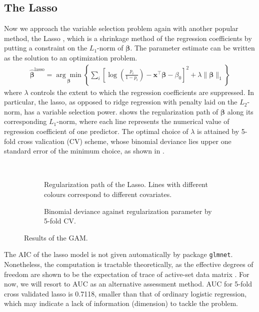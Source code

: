 \subsection{The Lasso}
Now we approach the variable selection problem again with another popular method, the Lasso \cite{Friedman:2001:ESL}, which is a shrinkage method of the regression coefficients by putting a constraint on the $L_1$-norm of $\boldsymbol{\beta}$. The parameter estimate can be written as the solution to an optimization problem.
\begin{align}
\widehat{\boldsymbol{\beta}}^{\text{lasso}}=\underset{\boldsymbol{\beta}}{\arg\min}\left\{\sum_i\left[\log\left(\frac{p_i}{1-p_i}\right)-\mathbf{x}^\top\boldsymbol{\beta}-\beta_0\right]^2+\lambda\|\boldsymbol{\beta}\|_1\right\}
\end{align}
where $\lambda$ controls the extent to which the regression coefficients are suppressed. In particular, the lasso, as opposed to ridge regression with penalty laid on the $L_2$-norm, has a variable selection power.  shows the regularization path of $\boldsymbol{\beta}$ along its corresponding $L_1$-norm, where each line represents the numerical value of regression coefficient of one predictor. The optimal choice of $\lambda$ is attained by 5-fold cross valication (CV) scheme, whose binomial deviance lies upper one standard error of the minimum choice, as shown in .

\begin{figure}[tpb]
  \centering
    \begin{subfigure}[t]{.5\textwidth} \centering
	\resizebox{\textwidth}{!}{%
	}
	\caption{Regularization path of the Lasso. Lines with different colours correspond to different covariates.} \label{lassopath}
    \end{subfigure}%
    \begin{subfigure}[t]{.5\textwidth} \centering
	\resizebox{\textwidth}{!}{%
	    }
	\caption{Binomial deviance against regularization parameter by 5-fold CV.} \label{lassocv}
    \end{subfigure}
    \caption{Results of the GAM.}
\end{figure}

\par The AIC of the lasso model is not given automatically by package \texttt{glmnet}. Nonetheless, the computation is tractable theoretically, as the effective degrees of freedom are shown to be the expectation of trace of active-set data matrix \cite{tibshirani:2012:dflasso}. For now, we will resort to AUC as an alternative assessment method. AUC for 5-fold cross validated lasso is 0.7118, smaller than that of ordinary logistic regression, which may indicate a lack of information (dimension) to tackle the problem.

